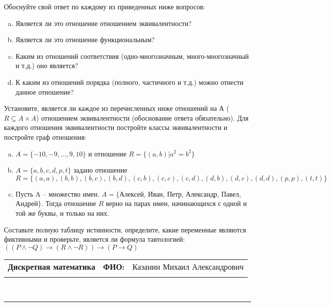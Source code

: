 \documentclass[10pt]{exam}
\newcommand{\class}{Дискретная математика}
\newcommand{\examdate}{}
\begin{document}
\begin{questions}
Обоснуйте свой ответ по каждому из приведенных ниже вопросов:
\begin{enumerate} [a)]\setcounter{enumi}{0}
    \item Является ли это отношение отношением эквивалентности?
    \item Является ли это отношение функциональным?
    \item Каким из отношений соответствия (одно-многозначным, много-многозначный и т.д.) оно является?
    \item К каким из отношений порядка (полного, частичного и т.д.) можно отнести данное отношение?
\end{enumerate}
\question
Установите, является ли каждое из перечисленных ниже отношений на А ($R \subseteq A \times A$) отношением эквивалентности (обоснование ответа обязательно). Для каждого отношения эквивалентности постройте классы 
эквивалентности и постройте граф отношения:
\begin{enumerate} [a)]\setcounter{enumi}{0}
\item $A = \{-10, -9, … , 9, 10\}$ и отношение $R = \{(a,b)|a^{2} = b^{2}\}$
\item $A = \{a, b, c, d, p, t\}$ задано отношение $R = \{(a, a), (b, b), (b, c), (b, d), (c, b), (c, c), (c, d), (d, b), (d, c), (d, d), (p,p), (t,t)\}$
\item Пусть A – множество имен. $A = \{ $Алексей, Иван, Петр, Александр, Павел, Андрей$ \}$. Тогда отношение $R$ верно на парах имен, начинающихся с одной и той же буквы, и только на них.
\end{enumerate}\question Составьте полную таблицу истинности, определите, какие переменные являются фиктивными и проверьте, является ли формула тавтологией:
$(( P \land \neg Q) \rightarrow (R \land \neg R)) \rightarrow (P \rightarrow Q)$

\end{questions}
\newpage
\begin{flushright}
\begin{tabular}{p{2.8in} r l}
\textbf{\class} & \textbf{ФИО:} &Казанин Михаил Александрович
\\

\textbf{\examdate} &&\\
\end{tabular}\\
\end{flushright}
\rule[1ex]{\textwidth}{.1pt}
\end{document}
